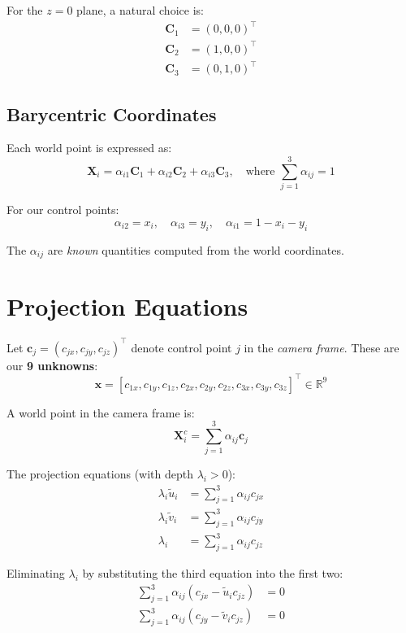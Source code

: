 \documentclass[11pt]{article}
\newcommand{\vect}[1]{\mathbf{#1}}
\begin{document}
For the $z=0$ plane, a natural choice is:
\begin{align}
\vect{C}_1 &= (0, 0, 0)^\top \\
\vect{C}_2 &= (1, 0, 0)^\top \\
\vect{C}_3 &= (0, 1, 0)^\top
\end{align}

\subsection{Barycentric Coordinates}

Each world point is expressed as:
\[
\vect{X}_i = \alpha_{i1}\vect{C}_1 + \alpha_{i2}\vect{C}_2 + \alpha_{i3}\vect{C}_3, \quad \text{where } \sum_{j=1}^{3} \alpha_{ij} = 1
\]

For our control points:
\[
\alpha_{i2} = x_i, \quad \alpha_{i3} = y_i, \quad \alpha_{i1} = 1 - x_i - y_i
\]

The $\alpha_{ij}$ are \emph{known} quantities computed from the world coordinates.

\section{Projection Equations}

Let $\vect{c}_j = (c_{jx}, c_{jy}, c_{jz})^\top$ denote control point $j$ in the \emph{camera frame}. These are our \textbf{9 unknowns}:
\[
\vect{x} = [c_{1x}, c_{1y}, c_{1z}, c_{2x}, c_{2y}, c_{2z}, c_{3x}, c_{3y}, c_{3z}]^\top \in \mathbb{R}^9
\]

A world point in the camera frame is:
\[
\vect{X}_i^c = \sum_{j=1}^{3} \alpha_{ij} \vect{c}_j
\]

The projection equations (with depth $\lambda_i > 0$):
\begin{align}
\lambda_i \tilde{u}_i &= \sum_{j=1}^{3} \alpha_{ij} c_{jx} \\
\lambda_i \tilde{v}_i &= \sum_{j=1}^{3} \alpha_{ij} c_{jy} \\
\lambda_i &= \sum_{j=1}^{3} \alpha_{ij} c_{jz}
\end{align}

Eliminating $\lambda_i$ by substituting the third equation into the first two:
\begin{align}
\sum_{j=1}^{3} \alpha_{ij} (c_{jx} - \tilde{u}_i c_{jz}) &= 0 \label{eq:proj1}\\
\sum_{j=1}^{3} \alpha_{ij} (c_{jy} - \tilde{v}_i c_{jz}) &= 0 \label{eq:proj2}
\end{align}
\end{document}
